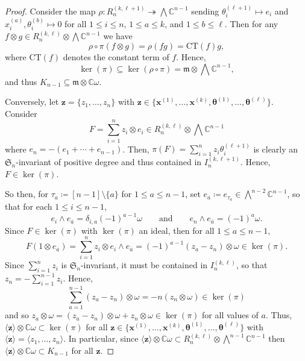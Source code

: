 \documentclass[11pt, reqno]{amsart}
\theoremstyle{definition}
\theoremstyle{remark}
\numberwithin{equation}{section}
\newcommand{\0}{\emptyset}
\newcommand{\C}{\mathbb{C}}
\renewcommand{\S}{\mathfrak{S}}
\begin{document}
\begin{proof}
    Consider the map $\rho: R_n^{(k,\ell+1)} \twoheadrightarrow \bigwedge \C^{n-1}$ 
    sending $\theta_i^{(\ell+1)} \mapsto e_i$ and $x_i^{(a)}, \theta_i^{(b)} \mapsto 0$ 
    for all $1 \leq i\leq n$, $1\leq a \leq k$, and $1\leq b \leq \ell$. 
    Then for any $f \otimes g \in R_n^{(k,\ell)} \otimes \bigwedge \C^{n-1}$ we have
    \[
        \rho \circ \pi(f \otimes g) = \rho(fg) = \mathrm{CT}(f)g,
    \]
    where $\mathrm{CT}(f)$ denotes the constant term of $f$. Hence, 
    \[
        \ker(\pi) \subseteq \ker(\rho \circ \pi) = \mathfrak{m} \otimes \bigwedge \C^{n-1},
    \]
    and thus $K_{n-1} \subseteq \mathfrak{m} \otimes \C \omega$.

    Conversely, let $\bm{z}=\{z_1,\ldots, z_n\}$ with 
    $\bm{z} \in \{ \bm{x}^{(1)},\ldots, \bm{x}^{(k)}, 
    \bm{\theta}^{(1)}, \ldots, \bm{\theta}^{(\ell)}\}$. 
    Consider 
    \[
        F = \sum_{i=1}^n z_i \otimes e_i \in R_n^{(k,\ell)} \otimes \bigwedge \C^{n-1}
    \]
    where $e_n= -(e_1 + \cdots + e_{n-1})$. 
    Then, $\pi(F) =  \sum_{i=1}^n z_i\theta_i^{(\ell+1)}$ is clearly an 
    $\S_n$-invariant of positive degree and thus contained in $I_n^{(k,\ell+1)}$. 
    Hence, $F \in \ker(\pi)$.

    So then, for $\tau_a\coloneqq[n-1]\setminus \{a\}$ for $1 \leq a \leq n-1$, 
    set $e_{\overline{a}}\coloneqq e_{{\tau_{a}}} \in \bigwedge^{n-2}\C^{n-1}$, 
    so that for each $1\leq i \leq n-1$,
    \[
        e_i \wedge e_{\overline{a}} = \delta_{i,a} (-1)^{a-1} \omega
        \qquad \text{and} \qquad
        e_n \wedge e_{\overline{a}} = (-1)^a \omega.
    \]
    Since $F \in \ker(\pi)$ with $\ker(\pi)$ an ideal, then for all $1\leq a \leq n-1$,
    \[
        F ( 1 \otimes e_{\overline{a}}) = \sum_{i=1}^n z_i \otimes e_i\wedge e_{\overline{a}} 
        = (-1)^{a-1}(z_a-z_n) \otimes \omega \in \ker(\pi).
    \]
    Since $\sum_{i=1}^n z_i$ is $\S_n$-invariant, it must be contained in 
    $I_n^{(k,\ell)}$, so that $z_n = - \sum_{i=1}^{n-1} z_i$. Hence, 
    \[
        \sum_{a=1}^{n-1} (z_a -z_n)\otimes \omega = -n (z_n \otimes \omega) \in \ker(\pi)
    \]
    and so $z_a \otimes \omega = (z_a-z_n)\otimes \omega + z_n\otimes \omega \in \ker(\pi)$ 
    for all values of $a$. 
    Thus, $\langle \bm{z} \rangle \otimes \C\omega \subset \ker(\pi)$ for all 
    $\bm{z} \in \{ \bm{x}^{(1)},\ldots, \bm{x}^{(k)}, 
    \bm{\theta}^{(1)}, \ldots, \bm{\theta}^{(\ell)}\}$ with 
    $\langle \bm{z} \rangle = \langle z_1,\ldots, z_n\rangle$. 
    In particular, since $\langle \bm{z} \rangle \otimes \C\omega \subset 
    R_n^{(k,\ell)} \otimes \bigwedge^{n-1}\C^{n-1}$ then 
    $\langle \bm{z} \rangle \otimes \C\omega \subset K_{n-1}$ for all $\bm{z}$.


\end{proof}
\end{document}
